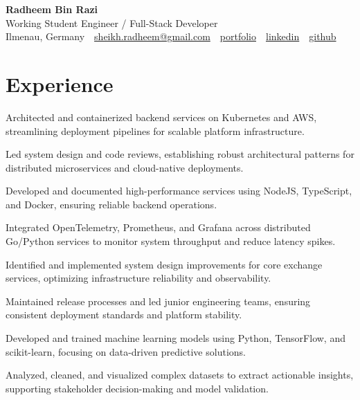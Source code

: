 \documentclass[10pt,a4paper]{resume}
\makeatletter
\newcommand{\Portfolio}{https://radheem.github.io/my-cv}
\newcommand{\PortfolioText}{portfolio}
\newcommand{\GitHub}{https://github.com/radheem}
\newcommand{\LinkedIn}{https://www.linkedin.com/in/radheem-razi}
\newcommand{\Email}{sheikh.radheem@gmail.com}
\makeatother
\begin{document}
\begin{center}
  {\huge\bfseries Radheem Bin Razi}\\[3pt]
  {\large Working Student Engineer / Full-Stack Developer}\\[6pt]
  \small
  Ilmenau, Germany \,\textbar\,
  \href{mailto:\Email}{\Email} \,\textbar\,
  \href{\Portfolio}{\PortfolioText} \,\textbar\,
  \href{\LinkedIn}{linkedin} \,\textbar\,
  \href{\GitHub}{github}
\end{center}
\vspace{2pt}

\section{Experience}

\bullets
  \item Architected and containerized backend services on Kubernetes and AWS, streamlining deployment pipelines for scalable platform infrastructure.
  \item Led system design and code reviews, establishing robust architectural patterns for distributed microservices and cloud-native deployments.
  \item Developed and documented high-performance services using NodeJS, TypeScript, and Docker, ensuring reliable backend operations.
\bulletsend
\vspace{1.5pt}
\bullets
  \item Integrated OpenTelemetry, Prometheus, and Grafana across distributed Go/Python services to monitor system throughput and reduce latency spikes.
  \item Identified and implemented system design improvements for core exchange services, optimizing infrastructure reliability and observability.
  \item Maintained release processes and led junior engineering teams, ensuring consistent deployment standards and platform stability.
\bulletsend
\vspace{1.5pt}
\bullets
  \item Developed and trained machine learning models using Python, TensorFlow, and scikit-learn, focusing on data-driven predictive solutions.
  \item Analyzed, cleaned, and visualized complex datasets to extract actionable insights, supporting stakeholder decision-making and model validation.
\bulletsend
\vspace{1.5pt}
\end{document}
